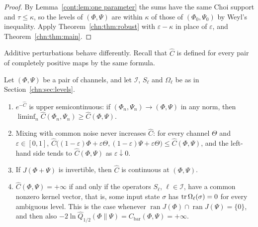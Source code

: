 \begin{proof}
By Lemma~\ref{cont:lem:one parameter} the sums have the same Choi support and $\tau\le\kappa$, so the levels of $(\Phi,\Psi)$ are within $\kappa$ of those of $(\Phi_0,\Psi_0)$ by Weyl's inequality. Apply Theorem~\ref{chn:thm:robust} with $\varepsilon-\kappa$ in place of $\varepsilon$, and Theorem~\ref{chn:thm:main}.
\end{proof}

Additive perturbations behave differently. Recall that $\widehat C$ is defined for every pair of completely positive maps by the same formula.

\begin{theorem}[Semicontinuity]\label{chn:thm:semicont}
Let $(\Phi,\Psi)$ be a pair of channels, and let $\mathcal I$, $S_\ell$ and $\Omega_\ell$ be as in Section~\ref{chn:sec:levels}.
\begin{enumerate}
\item[(a)] $e^{-\widehat C}$ is upper semicontinuous: if $(\Phi_n,\Psi_n)\to(\Phi,\Psi)$ in any norm, then $\liminf_n\widehat C(\Phi_n,\Psi_n)\ge\widehat C(\Phi,\Psi)$.
\item[(b)] Mixing with common noise never increases $\widehat C$: for every channel $\Theta$ and $\varepsilon\in[0,1]$, $\widehat C\big((1-\varepsilon)\Phi+\varepsilon\Theta,(1-\varepsilon)\Psi+\varepsilon\Theta\big)\le\widehat C(\Phi,\Psi)$, and the left-hand side tends to $\widehat C(\Phi,\Psi)$ as $\varepsilon\downarrow0$.
\item[(c)] If $J(\Phi+\Psi)$ is invertible, then $\widehat C$ is continuous at $(\Phi,\Psi)$.
\item[(d)] $\widehat C(\Phi,\Psi)=+\infty$ if and only if the operators $S_\ell$, $\ell\in\mathcal I$, have a common nonzero kernel vector, that is, some input state $\sigma$ has $\operatorname{tr}\Omega_\ell(\sigma)=0$ for every ambiguous level. This is the case whenever $\operatorname{ran}J(\Phi)\cap\operatorname{ran}J(\Psi)=\{0\}$, and then also $-2\ln\widehat Q_{1/2}(\Phi\|\Psi)=C_{\mathrm{bar}}(\Phi,\Psi)=+\infty$.
\end{enumerate}
\end{theorem}

